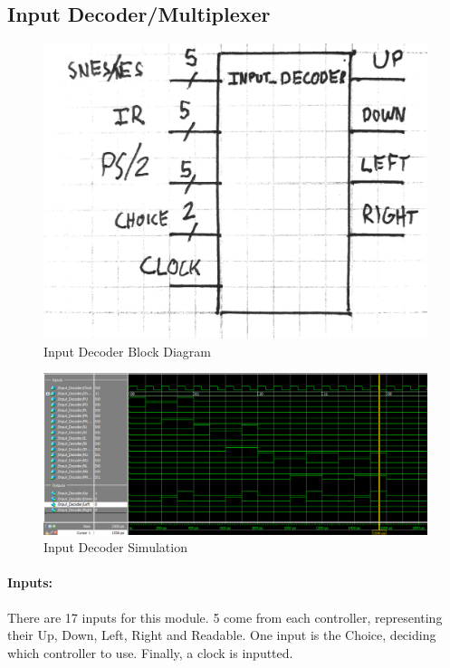 \documentclass[]{article}
\begin{document}
\subsection{Input Decoder/Multiplexer}
\begin{figure}[H]\centering
    \includegraphics[width=0.5\linewidth]{figures/Input_Decoder_Block.jpg}
    \caption{Input Decoder Block Diagram}
    \label{fig:inputDecoderBlock}
\end{figure}
\begin{figure}[H]\centering
    \includegraphics[width=\linewidth]{figures/Input_Decoder_Sim.png}
    \caption{Input Decoder Simulation}
    \label{fig:inputDecoderSim}
\end{figure}
\paragraph{Inputs:} There are 17 inputs for this module. 5 come from each controller, representing their Up, Down, Left, Right and Readable.
One input is the Choice, deciding which controller to use. Finally, a clock is inputted.
\end{document}
